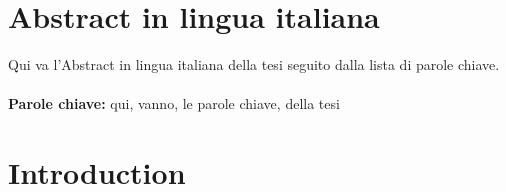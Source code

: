 \documentclass{Configuration_Files/PoliMi3i_thesis}
\begin{document}
\chapter*{Abstract in lingua italiana}
Qui va l'Abstract in lingua italiana della tesi seguito dalla lista di parole chiave.
\\
\\
\textbf{Parole chiave:} qui, vanno, le parole chiave, della tesi %


\thispagestyle{empty}
\tableofcontents %
\thispagestyle{empty}
\cleardoublepage

%
%
%    
%

\mainmatter %


\chapter*{Introduction}
\end{document}

